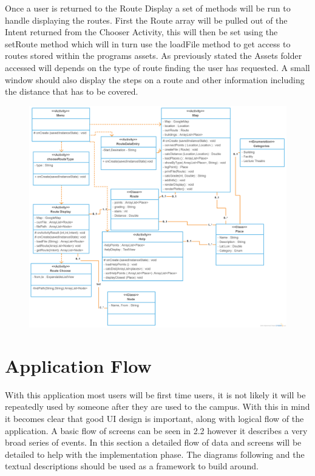 Once a user is returned to the Route Display a set of methods will be run to handle displaying the routes. First the Route array will be pulled out of the Intent returned from the Chooser Activity, this will then be set using the setRoute method which will in turn use the loadFile method to get access to routes stored within the programs assets. As previously stated the Assets folder accessed will depends on the type of route finding the user has requested. A small window should also display the steps on a route and other information including the distance that has to be covered. 


\begin{figure}
\includegraphics[scale=0.28]{Chapter2/class.png} \\
\end{figure}
\newpage
\section{Application Flow}
With this application most users will be first time users, it is not likely it will be repeatedly used by someone after they are used to the campus. With this in mind it becomes clear that good UI design is important, along with logical flow of the application. A basic flow of screens can be seen in 2.2 however it describes a very broad series of events. In this section a detailed flow of data and screens will be detailed to help with the implementation phase. The diagrams following and the textual descriptions should be used as a framework to build around. 
